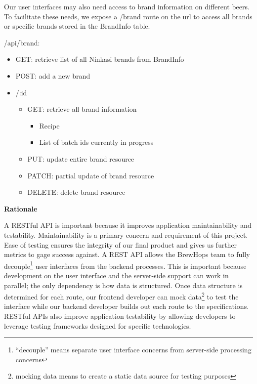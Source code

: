 \documentclass[draftclsnofoot,onecolumn,letterpaper,10pt]{IEEEtran}
\begin{document}
			Our user interfaces may also need access to brand information on different beers.
			To facilitate these needs, we expose a /brand route on the url to access all brands or specific brands stored in the BrandInfo table.

			/api/brand:
			\begin{itemize}
				\item GET: retrieve list of all Ninkasi brands from BrandInfo
				\item POST: add a new brand

				\item /:id
				\begin{itemize}
					\item GET: retrieve all brand information
					\begin{itemize}
						\item Recipe
						\item List of batch ids currently in progress
					\end{itemize}
					\item PUT: update entire brand resource
					\item PATCH: partial update of brand resource
					\item DELETE: delete brand resource
				\end{itemize}
			\end{itemize}



			\textbf{Rationale}

			A RESTful API is important because it improves application maintainability and testability.
			Maintainability is a primary concern and requirement of this project.
			Ease of testing ensures the integrity of our final product and gives us further metrics to gage success against.
			A REST API allows the BrewHops team to fully decouple\footnote{“decouple” means separate user interface concerns from server-side processing concerns} user interfaces from the backend processes.
			This is important because development on the user interface and the server-side support can work in parallel; the only dependency is how data is structured.
			Once data structure is determined for each route, our frontend developer can mock data\footnote{mocking data means to create a static data source for testing purposes} to test the interface while our backend developer builds out each route to the specifications.
			RESTful APIs also improve application testability by allowing developers to leverage testing frameworks designed for specific technologies.
\end{document}
